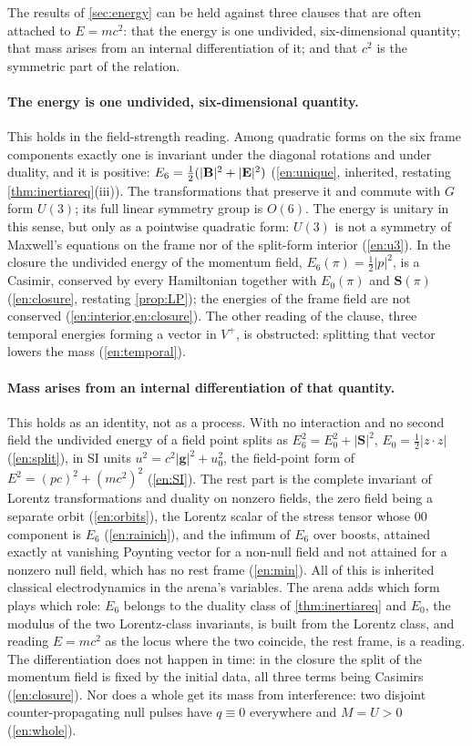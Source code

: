The results of \cref{sec:energy} can be held against three clauses that are often attached to $E=mc^2$: that the energy is one undivided,
six-dimensional quantity; that mass arises from an internal differentiation of it; and that $c^2$ is the symmetric part of the relation.

\paragraph{The energy is one undivided, six-dimensional quantity.} This holds in the field-strength reading. Among quadratic forms on the six
frame components exactly one is invariant under the diagonal rotations and under duality, and it is positive: $E_6=\tfrac12(|\mathbf B|^2+|\mathbf E|^2)$
(\cref{en:unique}, inherited, restating \cref{thm:inertiareq}(iii)). The transformations that preserve it and commute with $G$ form $U(3)$; its full
linear symmetry group is $O(6)$. The energy is unitary in this sense, but only as a pointwise quadratic form: $U(3)$ is not a symmetry of Maxwell's equations on the frame nor of the split-form interior (\cref{en:u3}). In
the closure the undivided energy of the momentum field, $E_6(\pi)=\tfrac12|p|^2$, is a Casimir, conserved by every Hamiltonian together with
$E_0(\pi)$ and $\mathbf S(\pi)$ (\cref{en:closure}, restating \cref{prop:LP}); the energies of the frame field are not conserved
(\cref{en:interior,en:closure}). The other reading of the clause, three temporal energies forming a vector in $V^+$, is obstructed: splitting that
vector lowers the mass (\cref{en:temporal}).

\paragraph{Mass arises from an internal differentiation of that quantity.} This holds as an identity, not as a process. With no interaction and no
second field the undivided energy of a field point splits as $E_6^2=E_0^2+|\mathbf S|^2$, $E_0=\tfrac12|z\cdot z|$ (\cref{en:split}), in SI units
$u^2=c^2|\mathbf g|^2+u_0^2$, the field-point form of $E^2=(pc)^2+(mc^2)^2$ (\cref{en:SI}). The rest part is the complete invariant of Lorentz
transformations and duality on nonzero fields, the zero field being a separate orbit (\cref{en:orbits}), the Lorentz scalar of the stress tensor whose
$00$ component is $E_6$ (\cref{en:rainich}), and the infimum of $E_6$ over boosts, attained exactly at vanishing Poynting vector for a non-null field and
not attained for a nonzero null field, which has no rest frame (\cref{en:min}). All of this is inherited classical electrodynamics in the arena's
variables. The arena adds which form plays which role: $E_6$ belongs to the duality class of \cref{thm:inertiareq} and $E_0$, the modulus of the two
Lorentz-class invariants, is built from the Lorentz class, and reading $E=mc^2$ as the locus where the two coincide, the rest frame, is a reading. The
differentiation does not happen in time: in the closure the split of the momentum field is fixed by the initial data, all three terms being
Casimirs (\cref{en:closure}). Nor does a whole get its mass from interference: two disjoint counter-propagating null pulses have $q\equiv0$ everywhere
and $M=U>0$ (\cref{en:whole}).

